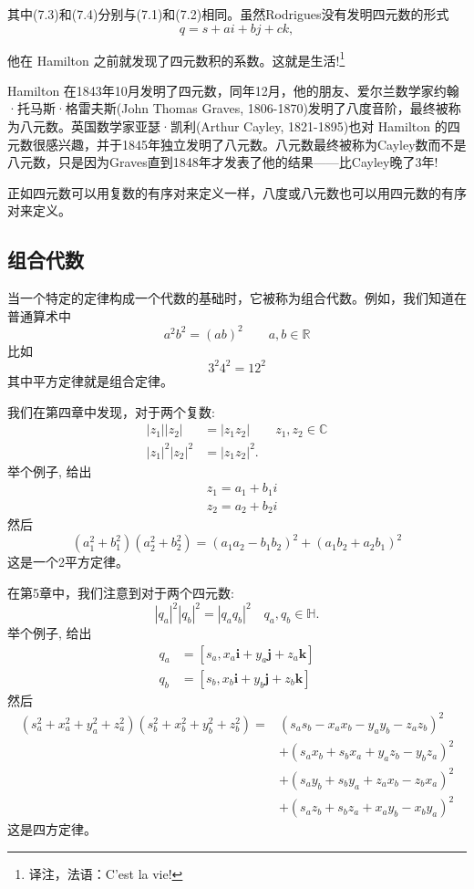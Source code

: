 其中(7.3)和(7.4)分别与(7.1)和(7.2)相同。虽然Rodrigues没有发明四元数的形式
$$
q=s+a i+b j+c k,
$$

他在 Hamilton 之前就发现了四元数积的系数。这就是生活!\footnote{译注，法语：C'est la vie!}

Hamilton 在1843年10月发明了四元数，同年12月，他的朋友、爱尔兰数学家约翰·托马斯·格雷夫斯(John Thomas Graves, 1806-1870)发明了八度音阶，最终被称为八元数。英国数学家亚瑟·凯利(Arthur Cayley, 1821-1895)也对 Hamilton 的四元数很感兴趣，并于1845年独立发明了八元数。八元数最终被称为Cayley数而不是八元数，只是因为Graves直到1848年才发表了他的结果——比Cayley晚了3年!

正如四元数可以用复数的有序对来定义一样，八度或八元数也可以用四元数的有序对来定义。

\subsection{组合代数}
当一个特定的定律构成一个代数的基础时，它被称为组合代数。例如，我们知道在普通算术中
$$
a^{2} b^{2}=(a b)^{2} \qquad a, b \in \mathbb{R}
$$
比如
$$
3^{2} 4^{2}=12^{2}
$$
其中平方定律就是组合定律。

我们在第四章中发现，对于两个复数:
$$
\begin{aligned}
\left|z_{1}\right|\left|z_{2}\right| & =\left|z_{1} z_{2}\right| \qquad z_{1}, z_{2} \in \mathbb{C} \\
\left|z_{1}\right|^{2}\left|z_{2}\right|^{2} & =\left|z_{1} z_{2}\right|^{2} .
\end{aligned}
$$
举个例子, 给出
$$
\begin{aligned}
& z_{1}=a_{1}+b_{1} i \\
& z_{2}=a_{2}+b_{2} i
\end{aligned}
$$
然后
$$
\left(a_{1}^{2}+b_{1}^{2}\right)\left(a_{2}^{2}+b_{2}^{2}\right)=\left(a_{1} a_{2}-b_{1} b_{2}\right)^{2}+\left(a_{1} b_{2}+a_{2} b_{1}\right)^{2}
$$
这是一个2平方定律。

在第5章中，我们注意到对于两个四元数:
$$
\left|q_{a}\right|^{2}\left|q_{b}\right|^{2}=\left|q_{a} q_{b}\right|^{2} \quad q_{a}, q_{b} \in \mathbb{H} .
$$
举个例子, 给出
$$
\begin{aligned}
q_{a} & =\left[s_{a}, x_{a} \mathbf{i}+y_{a} \mathbf{j}+z_{a} \mathbf{k}\right] \\
q_{b} & =\left[s_{b}, x_{b} \mathbf{i}+y_{b} \mathbf{j}+z_{b} \mathbf{k}\right]
\end{aligned}
$$
然后
$$
\begin{aligned}
\left(s_{a}^{2}+x_{a}^{2}+y_{a}^{2}+z_{a}^{2}\right)\left(s_{b}^{2}+x_{b}^{2}+y_{b}^{2}+z_{b}^{2}\right)= & \left(s_{a} s_{b}-x_{a} x_{b}-y_{a} y_{b}-z_{a} z_{b}\right)^{2} \\
& +\left(s_{a} x_{b}+s_{b} x_{a}+y_{a} z_{b}-y_{b} z_{a}\right)^{2} \\
& +\left(s_{a} y_{b}+s_{b} y_{a}+z_{a} x_{b}-z_{b} x_{a}\right)^{2} \\
& +\left(s_{a} z_{b}+s_{b} z_{a}+x_{a} y_{b}-x_{b} y_{a}\right)^{2}
\end{aligned}
$$
这是四方定律。

